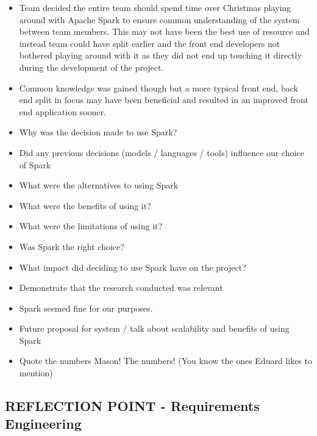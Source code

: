 \documentclass{l3proj}
\begin{document}
\begin{itemize}
\item Team decided the entire team should spend time over Christmas playing around with Apache Spark to ensure common understanding of the system between team members. This may not have been the best use of resource and instead team could have split earlier and the front end developers not bothered playing around with it as they did not end up touching it directly during the development of the project. 
\item Common knowledge was gained though but a more typical front end, back end split in focus may have been beneficial and resulted in an improved front end application sooner.
\item Why was the decision made to use Spark?
\item Did any previous decisions (models / languages / tools) influence our choice of Spark
\item What were the alternatives to using Spark
\item What were the benefits of using it?
\item What were the limitations of using it?
\item Was Spark the right choice?
\item What impact did deciding to use Spark have on the project?
\item Demonstrate that the research conducted was relevant
\item Spark seemed fine for our purposes.
\item Future proposal for system / talk about scalability and benefits of using Spark
\item Quote the numbers Mason! The numbers! (You know the ones Eduard likes to mention)
\end{itemize}


\subsection{REFLECTION POINT - Requirements Engineering}
\label{sec:teamstructure}
\end{document}

